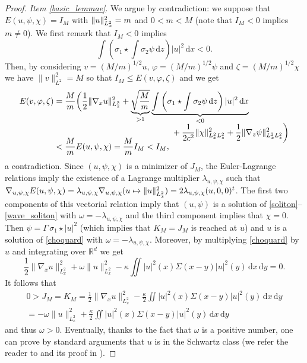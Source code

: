 \documentclass[JEP,XML,SOM,NoEqCountersInSection,NoFloatCountersInSection,Unicode,published]{cedram}
\newcommand\mto{\mathchoice{\longmapsto}{\mapsto}{\mapsto}{\mapsto}}
\theoremstyle{definition}
\newcommand{\R}{\mathbb{R}}
\newcommand{\ud}{\, {\mathrm{d}}}
\begin{document}
\begin{proof}
\textit{Item \eqref{basic_lemmae}}. We argue by contradiction: we suppose that $E(u,\psi,\chi)=I_{M}$ with $\|u\|_{L_{x}^{2}}^{2}=\nobreak m$ and $0<m<M$ (note that $I_{M}<0$ implies $m\neq 0$). We first remark that $I_{M}<0$ implies
\[
\int\left(\sigma_{1}\star\int\sigma_{2}\psi\ud z\right)|u|^{2}\ud x<0.
\]
Then, by considering $v=(M/m)^{1/2}u$, $\varphi=(M/m)^{1/2}\psi$ and $\zeta=(M/m)^{1/2}\chi$ we
have $\|v\|_{L^2}^2=M$ so that $I_{M}\leq E(v,\varphi,\zeta)$
and we get\vspace*{-3pt}
\begin{align*}
E(v,\varphi,\zeta)
&=\frac{M}{m}\biggl(\frac{1}{2}\|\nabla_{x}u\|_{L_{x}^{2}}^{2}+\underbrace{\sqrt{\frac{M}{m}}}_{>1}\underbrace{\int\left(\sigma_{1}\star\int\sigma_{2}\psi\ud z\right)|u|^{2}\ud x}_{<0}
\\[
-5pt]
&\hspace*{5cm}+\frac{1}{2c^{2}}\|\chi\|_{L_{x}^{2}L_{z}^{2}}^{2}+\frac{1}{2}\|\nabla_{z}\psi\|_{L_{x}^{2}L_{z}^{2}}^{2}\biggr)\\[
-10pt]
& <\frac{M}{m}E(u,\psi,\chi)=\frac{M}{m}I_{M}<I_{M},
\end{align*}
a contradiction. Since $(u,\psi,\chi)$ is a minimizer of $J_{M}$, the Euler-Lagrange relations imply the existence of a Lagrange multiplier $\lambda_{u,\psi,\chi}$ such that $\nabla_{u,\psi,\chi}E(u,\psi,\chi)=\lambda_{u,\psi,\chi}\nabla_{u,\psi,\chi}(u\mto\|u\|_{L_{x}^{2}}^{2})=2\lambda_{u,\psi,\chi}(u,0,0)^{t}$. The first two components of this vectorial relation imply that $(u,\psi)$ is a solution of \eqref{soliton}--\eqref{wave_soliton} with $\omega=-\lambda_{u,\psi,\chi}$ and the third component implies that $\chi=0$. Then $\psi=\Gamma\,\sigma_{1}\star|u|^{2}$ (which implies that $K_{M}=J_{M}$ is reached at $u$) and $u$ is a solution of \eqref{choquard} with $\omega=-\lambda_{u,\psi,\chi}$. Moreover, by multiplying \eqref{choquard} by $u$ and integrating over $\R^{d}$ we get\vspace*{-3pt}
\[
\frac{1}{2}\|\nabla_{x}u\|_{L_{x}^{2}}^{2}+\omega\|u\|_{L_{x}^{2}}^{2}-\kappa\iint|u|^{2}(x)\Sigma(x-y)|u|^{2}(y)\ud x\ud y=0.
\]
It follows that\vspace*{-5pt}
\begin{multline*}
0>J_{M}=K_{M}=\frac{1}{2}\|\nabla_{x}u\|_{L_{x}^{2}}^{2}-\frac{\kappa}{2}\iint|u|^{2}(x)\Sigma(x-y)|u|^{2}(y)\ud x\ud y\\
=-\omega\|u\|_{L_{x}^{2}}^{2}+\frac{\kappa}{2}\iint|u|^{2}(x)\Sigma(x-y)|u|^{2}(y)\ud x\ud y
\end{multline*}
and thus $\omega>0$. Eventually, thanks to the fact that $\omega$ is a positive number, one can prove by standard arguments that $u$ is in the Schwartz class (we refer the reader to \cite[Th.\,8]{Lieb_Choquard} and its proof in \cite[Rem.\,1]{Lions_Choquard}).


\end{proof}
\end{document}
